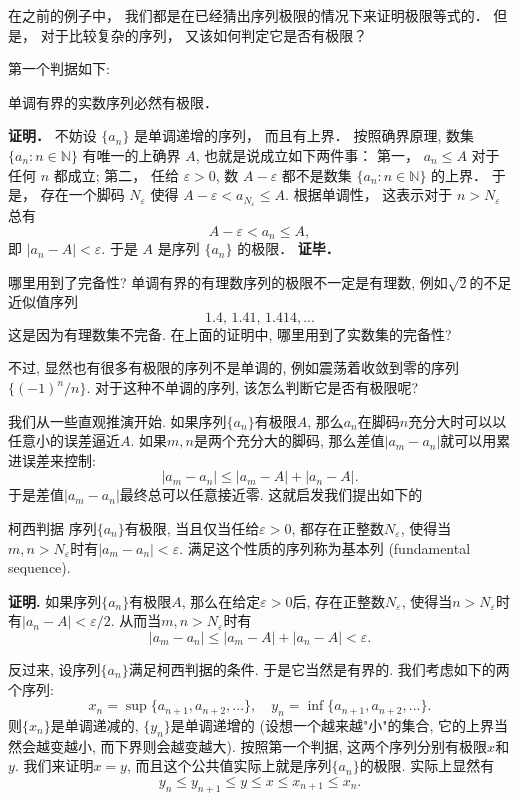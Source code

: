 

在之前的例子中， 我们都是在已经猜出序列极限的情况下来证明极限等式的． 但是， 对于比较复杂的序列， 又该如何判定它是否有极限？

第一个判据如下:

\begin{theorem}{}
单调有界的实数序列必然有极限．
\end{theorem}
\textbf{证明．} 不妨设 $\{a_n\}$ 是单调递增的序列， 而且有上界． 按照确界原理, 数集 $\{a_n:n\in\mathbb{N}\}$ 有唯一的上确界 $A$, 也就是说成立如下两件事： 第一， $a_n\leq A$ 对于任何 $n$ 都成立; 第二， 任给 $\varepsilon>0$, 数 $A-\varepsilon$ 都不是数集 $\{a_n:n\in\mathbb{N}\}$ 的上界． 于是， 存在一个脚码 $N_\varepsilon$ 使得 $A-\varepsilon<a_{N_\varepsilon}\leq A$. 根据单调性， 这表示对于 $n>N_\varepsilon$ 总有
\[A-\varepsilon<a_n\leq A,\]
即 $|a_n-A|<\varepsilon$. 于是 $A$ 是序列 $\{a_n\}$ 的极限． \textbf{证毕．}

\begin{exercise}{哪里用到了完备性?}
单调有界的有理数序列的极限不一定是有理数, 例如$\sqrt{2}$的不足近似值序列
$$
1.4,\,1.41,\,1.414,...
$$
这是因为有理数集不完备. 在上面的证明中, 哪里用到了实数集的完备性?
\end{exercise}

不过, 显然也有很多有极限的序列不是单调的, 例如震荡着收敛到零的序列$\{(-1)^n/n\}$. 对于这种不单调的序列, 该怎么判断它是否有极限呢?

我们从一些直观推演开始. 如果序列$\{a_n\}$有极限$A$, 那么$a_n$在脚码$n$充分大时可以以任意小的误差逼近$A$. 如果$m,n$是两个充分大的脚码, 那么差值$|a_m-a_n|$就可以用累进误差来控制:
$$
|a_m-a_n|\leq |a_m-A|+|a_n-A|.
$$
于是差值$|a_m-a_n|$最终总可以任意接近零. 这就启发我们提出如下的

\begin{theorem}{柯西判据}
序列$\{a_n\}$有极限, 当且仅当任给$\varepsilon>0$, 都存在正整数$N_\varepsilon$, 使得当$m,n>N_\varepsilon$时有$|a_m-a_n|<\varepsilon$. 满足这个性质的序列称为基本列 (fundamental sequence).
\end{theorem}

\textbf{证明.} 如果序列$\{a_n\}$有极限$A$, 那么在给定$\varepsilon>0$后, 存在正整数$N_\varepsilon$, 使得当$n>N_\varepsilon$时有$|a_n-A|<\varepsilon/2$. 从而当$m,n>N_\varepsilon$时有
$$
|a_m-a_n|\leq|a_m-A|+|a_n-A|<\varepsilon.
$$

反过来, 设序列$\{a_n\}$满足柯西判据的条件. 于是它当然是有界的. 我们考虑如下的两个序列:
$$
x_n=\sup\{a_{n+1},a_{n+2},...\},
\quad
y_n=\inf\{a_{n+1},a_{n+2},...\}.
$$
则$\{x_n\}$是单调递减的, $\{y_n\}$是单调递增的 (设想一个越来越"小"的集合, 它的上界当然会越变越小, 而下界则会越变越大). 按照第一个判据, 这两个序列分别有极限$x$和$y$. 我们来证明$x=y$, 而且这个公共值实际上就是序列$\{a_n\}$的极限. 实际上显然有
$$
y_n\leq y_{n+1}\leq y\leq x\leq x_{n+1}\leq x_n.
$$
